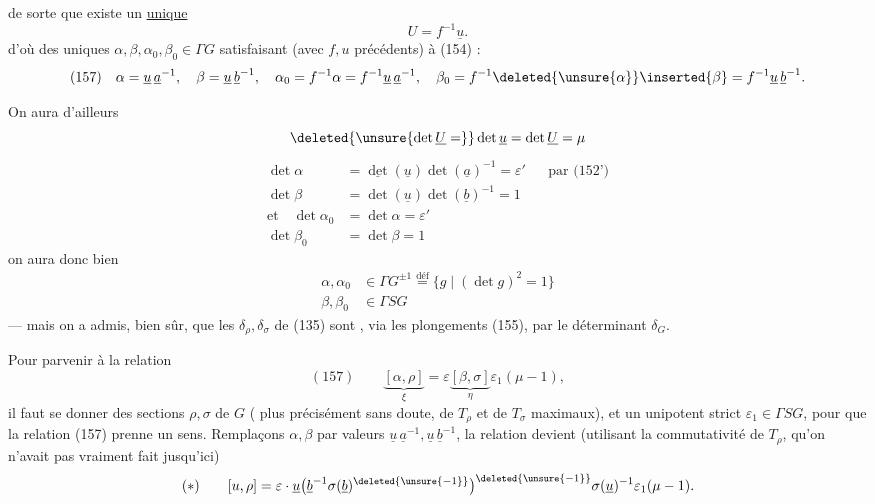 de sorte que  existe un \uline{unique} 
\[
U=f^{-1}\underline u.
\]
d'où des uniques $\alpha,\beta,\alpha_0,\beta_0\in\Gamma G$ satisfaisant (avec $f,u$ précédents) à (154) :
\[
(157)\quad
\alpha=\underline u\,\underline a^{-1},\quad
\beta=\underline u\,\underline b^{-1},\quad
\alpha_0=f^{-1}\alpha=f^{-1}\underline u\,\underline a^{-1},\quad
\beta_0=f^{-1}\deleted{\unsure{\alpha}}\inserted{\beta}=f^{-1}\underline u\,\underline b^{-1}.
\]


On aura d'ailleurs
\[
\deleted{\unsure{\det\underline U=}}\det\underline u
=\det\underline U=\mu
\]
\[
\begin{aligned}
\det\alpha&=\underline{\det}(\underline u)\det(\underline a)^{-1}=\varepsilon'
&&\text{par (152')}\\
\det\beta&=\det(\underline u)\det(\underline b)^{-1}=1\\[3pt]
\text{et}\quad\det\alpha_0&=\det\alpha=\varepsilon'\\
\det\beta_0&=\det\beta=1
\end{aligned}
\]
on aura donc bien
\[
\begin{aligned}
\alpha,\alpha_0&\in\Gamma G^{\pm1}\overset{\text{déf}}=
\{g\mid(\det g)^2=1\}\\
\beta,\beta_0&\in\Gamma SG
\end{aligned}
\]
--- mais on a admis, bien sûr, que les  $\delta_\rho,\delta_\sigma$ de (135) sont , via les plongements (155), par le déterminant $\delta_G$.

Pour parvenir à la relation  
\[
(157)\qquad
\underbrace{[\alpha,\rho]}_{\xi}
=\varepsilon\underbrace{[\beta,\sigma]}_{\eta}\varepsilon_1(\mu-1),
\]
il faut se donner des sections $\rho,\sigma$ de $G$ ( plus précisément sans doute,  de $T_\rho$ et de $T_\sigma$ maximaux), et un unipotent strict $\varepsilon_1\in\Gamma SG$, pour que la relation (157) prenne un sens.
Remplaçons $\alpha,\beta$ par  valeurs $\underline u\,\underline a^{-1},\underline u\,\underline b^{-1}$, la relation devient (utilisant la commutativité de $T_\rho$,  qu'on n'avait pas vraiment fait  jusqu'ici)
\[
(*)\qquad
[u,\rho]
=\varepsilon\cdot\underline u
\bigl(\underline b^{-1}\sigma(\underline b)^{\deleted{\unsure{-1}}}\bigr)^{\deleted{\unsure{-1}}}
\sigma(\underline u)^{-1}\varepsilon_1(\mu-1).
\]

